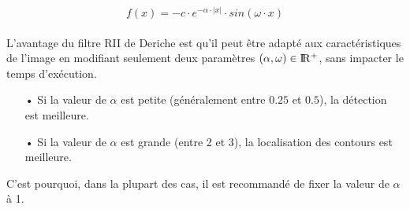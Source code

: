 \[ f(x)= -c \cdot e^{-\alpha \cdot |x|} \cdot sin(\omega \cdot x)  \]

\paragraph{}

L'avantage du filtre RII de Deriche est qu'il peut être adapté aux caractéristiques de l'image en modifiant seulement deux paramètres $ (\alpha, \omega) \in \rm I\!R^+ $, sans impacter le temps d'exécution.
\begin{itemize}
\item[•] Si la valeur de $ \alpha $ est petite (généralement entre $ 0.25 $ et $ 0.5 $), la détection est meilleure.
\item[•] Si la valeur de $ \alpha $ est grande (entre 2 et 3), la localisation des contours est meilleure.
\end{itemize}
\noindent
C'est pourquoi, dans la plupart des cas, il est recommandé de fixer la valeur de $ \alpha $ à 1.